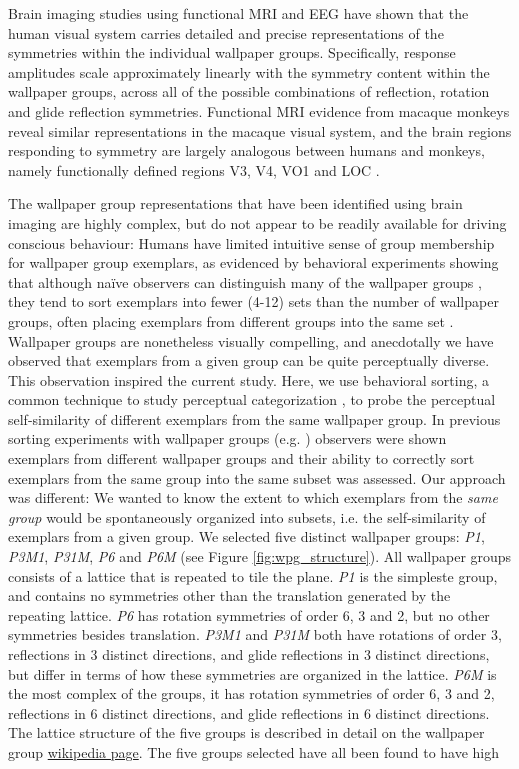 \documentclass[11pt, twoside]{article}
\begin{document}
Brain imaging studies using functional MRI \citep{RN1725} and EEG \citep{RN1959,kohler_clarke_2021} have shown that the human visual system carries detailed and precise representations of the symmetries within the individual wallpaper groups. Specifically, response amplitudes scale approximately linearly with the symmetry content within the wallpaper groups, across all of the possible combinations of reflection, rotation and glide reflection symmetries. Functional MRI evidence from macaque monkeys reveal similar representations in the macaque visual system, and the brain regions responding to symmetry are largely analogous between humans and monkeys, namely functionally defined regions V3, V4, VO1 and LOC \citep{audurier_symmetry_2021}.


The wallpaper group representations that have been identified using brain imaging are highly complex, but do not appear to be readily available for driving conscious behaviour: Humans have limited intuitive sense of group membership for wallpaper group exemplars, as evidenced by behavioral experiments showing that although naïve observers can distinguish many of the wallpaper groups \citep{RN1253}, they tend to sort exemplars into fewer (4-12) sets than the number of wallpaper groups, often placing exemplars from different groups into the same set \citep{RN172}. Wallpaper groups are nonetheless visually compelling, and anecdotally we have observed that exemplars from a given group can be quite perceptually diverse. This observation inspired the current study. Here, we use behavioral sorting, a common technique to study perceptual categorization \citep{Milton2008-ez,Pothos2011-vi}, to probe the perceptual self-similarity of different exemplars from the same wallpaper group. In previous sorting experiments with wallpaper groups (e.g. \citep{RN172}) observers were shown exemplars from different wallpaper groups and their ability to correctly sort exemplars from the same group into the same subset was assessed. Our approach was different: We wanted to know the extent to which exemplars from the \textit{same group} would be spontaneously organized into subsets, i.e. the self-similarity of exemplars from a given group. We selected five distinct wallpaper groups: \textit{P1}, \textit{P3M1}, \textit{P31M}, \textit{P6} and \textit{P6M} (see Figure \ref{fig:wpg_structure}). All wallpaper groups consists of a lattice that is repeated to tile the plane. \textit{P1} is the simpleste group, and contains no symmetries other than the translation generated by the repeating lattice. \textit{P6} has rotation symmetries of order 6, 3 and 2, but no other symmetries besides translation. \textit{P3M1} and \textit{P31M} both have rotations of order 3, reflections in 3 distinct directions, and glide reflections in 3 distinct directions, but differ in terms of how these symmetries are organized in the lattice. \textit{P6M} is the most complex of the groups, it has rotation symmetries of order 6, 3 and 2, reflections in 6 distinct directions, and glide reflections in 6 distinct directions. The lattice structure of the five groups is described in detail on the wallpaper group \href{https://en.wikipedia.org/wiki/Wallpaper_group}{wikipedia page}. The five groups selected have all been found to have high 
\end{document}
